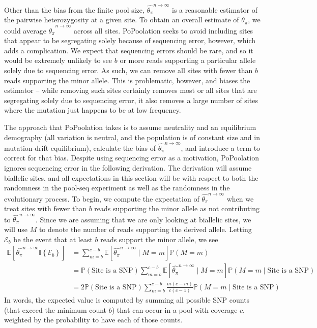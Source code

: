 \documentclass[a4paper,fontsize=9pt,DIV=14]{scrartcl}
\newcommand{\samplesize}{n}
\newcommand{\coverage}{c}
\newcommand{\thetapi}{\widehat{\theta_\pi}}
\begin{document}
Other than the bias from the finite pool size, $\thetapi^{\samplesize\to\infty}$ is a reasonable estimator of the pairwise heterozygosity at a given site.  To obtain an overall estimate of $\theta_\pi$, we could average $\thetapi^{\samplesize\to\infty}$ across all sites.  PoPoolation seeks to avoid including sites that appear to be segregating solely because of sequencing error, however, which adds a complication.  We expect that sequencing errors should be rare, and so it would be extremely unlikely to see $b$ or more reads supporting a particular allele solely due to sequencing error.  As such, we can remove all sites with fewer than $b$ reads supporting the minor allele.  This is problematic, however, and biases the estimator -- while removing such sites certainly removes most or all sites that are segregating solely due to sequencing error, it also removes a large number of sites where the mutation just happens to be at low frequency.

The approach that PoPoolation takes is to assume neutrality and an equilibrium demography (all variation is neutral, and the population is of constant size and in mutation-drift equilibrium), calculate the bias of $\thetapi^{\samplesize\to\infty}$, and introduce a term to correct for that bias.  Despite using sequencing error as a motivation, PoPoolation ignores sequencing error in the following derivation.  The derivation will assume biallelic sites, and all expectations in this section will be with respect to both the randomness in the pool-seq experiment as well as the randomness in the evolutionary process.  To begin, we compute the expectation of $\thetapi^{\samplesize\to\infty}$ when we treat sites with fewer than $b$ reads supporting the minor allele as not contributing to $\thetapi^{\samplesize\to\infty}$.  Since we are assuming that we are only looking at biallelic sites, we will use $M$ to denote the number of reads supporting the derived allele.  Letting $\mathcal{E}_b$ be the event that at least $b$ reads support the minor allele, we see
%
\begin{align}
\mathbb{E}\left[\thetapi^{\samplesize\to\infty} \mathbb{I}\left\{\mathcal{E}_b\right\}\right] &= \sum_{m=b}^{\coverage-b} \mathbb{E}\left[\thetapi^{\samplesize\to\infty} \mid M=m \right] \mathbb{P}(M = m)\\
&= \mathbb{P}\left(\text{Site is a SNP}\right)\sum_{m=b}^{\coverage-b} \mathbb{E}\left[\thetapi^{\samplesize\to\infty} \mid M=m \right] \mathbb{P}\left(M = m \mid \text{Site is a SNP}\right)\\
&=  2\mathbb{P}\left(\text{Site is a SNP}\right)\sum_{m=b}^{\coverage-b} \frac{m(\coverage-m)}{\coverage(\coverage-1)} \mathbb{P}\left(M = m \mid \text{Site is a SNP}\right)
\label{eq:ExpectationThetaPi}
\end{align}
%
In words, the expected value is computed by summing all possible SNP counts (that exceed the minimum count $b$)
that can occur in a pool with coverage $\coverage$,
weighted by the probability to have each of those counts.
\end{document}
